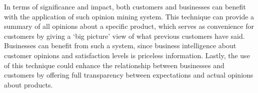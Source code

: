 \documentclass{sig-alternate}
\begin{document}
In terms of significance and impact, both customers and businesses can benefit with the application of such opinion mining system. This technique can provide a summary of all opinions about a specific product, which serves as convenience for customers by giving a `big picture' view of what previous customers have said. Businesses can benefit from such a system, since business intelligence about customer opinions and satisfaction levels is priceless information. Lastly, the use of this technique could enhance the relationship between businesses and customers by offering full transparency between expectations and actual opinions about products.

%




%
%
\end{document}
